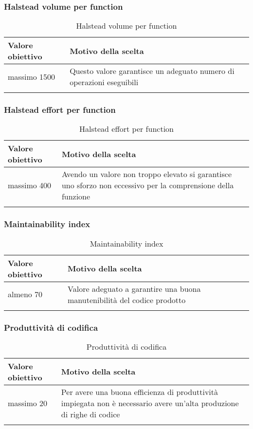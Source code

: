 \documentclass[../PianoDiQualifica_v3.0.0.tex]{subfiles}
\begin{document}
		\subsubsection{Halstead volume per function}
			\begin{longtable}[c] { >{\centering\arraybackslash}p{4cm} p{7cm} }
				\toprule
				\centerline{\textbf{Valore obiettivo}} & \centerline{\textbf{Motivo della scelta}} \\
				\midrule
					massimo 1500 & Questo valore garantisce un adeguato numero di operazioni eseguibili \\
				\bottomrule
				\caption{Halstead volume per function}
			\end{longtable}

		\subsubsection{Halstead effort per function}
			\begin{longtable}[c] { >{\centering\arraybackslash}p{4cm} p{7cm} }
				\toprule
				\centerline{\textbf{Valore obiettivo}} & \centerline{\textbf{Motivo della scelta}} \\
				\midrule
					massimo 400 & Avendo un valore non troppo elevato si garantisce uno sforzo non eccessivo per la comprensione della funzione \\
				\bottomrule
				\caption{Halstead effort per function}
			\end{longtable}

		\subsubsection{Maintainability index}
			\begin{longtable}[c] { >{\centering\arraybackslash}p{4cm} p{7cm} }
				\toprule
				\centerline{\textbf{Valore obiettivo}} & \centerline{\textbf{Motivo della scelta}} \\
				\midrule
					almeno 70 &	Valore adeguato a garantire una buona manutenibilità del codice prodotto \\
				\bottomrule
				\caption{Maintainability index}
			\end{longtable}

		\subsubsection{Produttività di codifica}
			\begin{longtable}[c] { >{\centering\arraybackslash}p{4cm} p{7cm} }
				\toprule
				\centerline{\textbf{Valore obiettivo}} & \centerline{\textbf{Motivo della scelta}} \\
				\midrule
					massimo 20 & Per avere una buona efficienza di produttività impiegata non è necessario avere un'alta produzione di righe di codice \\
				\bottomrule
				\caption{Produttività di codifica}
			\end{longtable}
\end{document}
